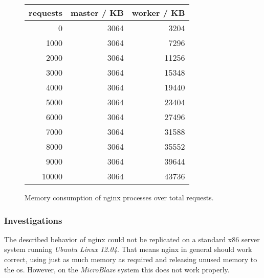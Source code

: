 \begin{figure}[H]
\begin{minipage}{0.4\textwidth}
\begin{tabular}{|r|r|r|}
    \hline
     \textbf{requests} & \textbf{master / KB} & \textbf{worker / KB} \\
    \hline
    0     & 3064  & 3204 \\
    1000  & 3064  & 7296 \\
    2000  & 3064  & 11256 \\
    3000  & 3064  & 15348 \\
    4000  & 3064  & 19440 \\
    5000  & 3064  & 23404 \\
    6000  & 3064  & 27496 \\
    7000  & 3064  & 31588 \\
    8000  & 3064  & 35552 \\
    9000  & 3064  & 39644 \\
    10000 & 3064  & 43736 \\
    \hline
    \end{tabular}
\end{minipage}
\begin{minipage}{0.65\textwidth}
	\centering
\end{minipage}
  \caption{Memory consumption of nginx processes over total requests.}
  \label{fig:nginx-mem}
\end{figure}

\subsubsection{Investigations}

The described behavior of nginx could not be replicated on a standard x86 server system running \textit{Ubuntu Linux 12.04}. That means nginx in general should work correct, using just as much memory as required and releasing unused memory to the \gls{os}. However, on the \textit{MicroBlaze} system this does not work properly.

